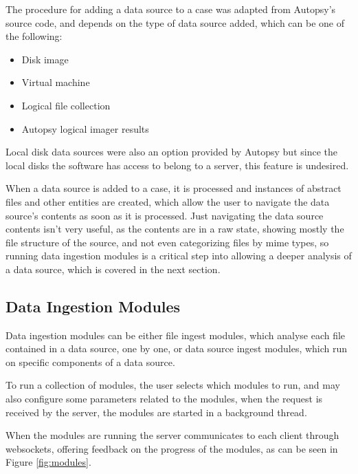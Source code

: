 The procedure for adding a data source to a case was adapted from Autopsy's source code, and depends on the type of data source added, which can be one of the following:
\begin{itemize}
 \item Disk image
 \item Virtual machine
 \item Logical file collection
 \item Autopsy logical imager results
\end{itemize}

Local disk data sources were also an option provided by Autopsy but since the local disks the software has access to belong to a server, this feature is undesired.

When a data source is added to a case, it is processed and instances of abstract files and other entities are created, which allow the user to navigate the data source's contents as soon as it is processed.
Just navigating the data source contents isn't very useful, as the contents are in a raw state, showing mostly the file structure of the source, and not even categorizing files by mime types, so running data
ingestion modules is a critical step into allowing a deeper analysis of a data source, which is covered in the next section.

\subsection{Data Ingestion Modules}

Data ingestion modules can be either file ingest modules, which analyse each file contained in a data source, one by one,
or data source ingest modules, which run on specific components of a data source.

To run a collection of modules, the user selects which modules to run, and may also configure some parameters related to the modules, when the request is received by the server, the modules are started in a background thread.

When the modules are running the server communicates to each client through websockets, offering feedback on the progress of the modules, as can be seen in Figure \ref{fig:modules}.

